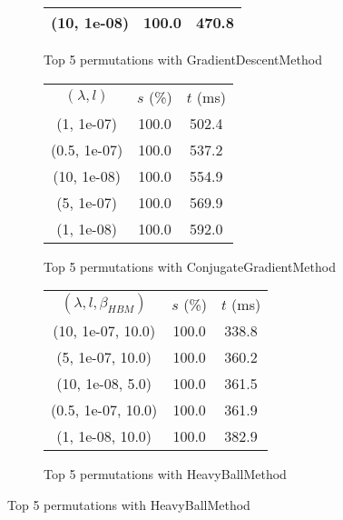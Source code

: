 \begin{figure}[H]
\begin{subfigure}[ht]{.5\textwidth}
\begin{tabular}{|c|c|c|}
(10, 1e-08) & 100.0 & 470.8 \\
\hline
\end{tabular}
\caption{Top 5 permutations with GradientDescentMethod}
\label{subfig:param_comp_MatrixSquareSum_GradientDescentMethod_NewtonsSearch}
\end{subfigure}
\hfill
\begin{subfigure}[ht]{.5\textwidth}
\begin{tabular}{|c|c|c|}
\hline
\rowcolor{gray!25}
\multicolumn{3}{|c|}{ConjugateGradientMethod} \\
\hline
\rowcolor{gray!25}
$(\lambda,l)$ & $s$ (\%) & $t$ (ms) \\
\hline
(1, 1e-07) & 100.0 & 502.4 \\
(0.5, 1e-07) & 100.0 & 537.2 \\
(10, 1e-08) & 100.0 & 554.9 \\
(5, 1e-07) & 100.0 & 569.9 \\
(1, 1e-08) & 100.0 & 592.0 \\
\hline
\end{tabular}
\caption{Top 5 permutations with ConjugateGradientMethod}
\label{subfig:param_comp_MatrixSquareSum_ConjugateGradientMethod_NewtonsSearch}
\end{subfigure}
\hfill
\begin{subfigure}[ht]{.5\textwidth}
\begin{tabular}{|c|c|c|}
\hline
\rowcolor{gray!25}
\multicolumn{3}{|c|}{HeavyBallMethod} \\
\hline
\rowcolor{gray!25}
$(\lambda,l,\beta_{HBM})$ & $s$ (\%) & $t$ (ms) \\
\hline
(10, 1e-07, 10.0) & 100.0 & 338.8 \\
(5, 1e-07, 10.0) & 100.0 & 360.2 \\
(10, 1e-08, 5.0) & 100.0 & 361.5 \\
(0.5, 1e-07, 10.0) & 100.0 & 361.9 \\
(1, 1e-08, 10.0) & 100.0 & 382.9 \\
\hline
\end{tabular}
\caption{Top 5 permutations with HeavyBallMethod}
\label{subfig:param_comp_MatrixSquareSum_HeavyBallMethod_NewtonsSearch}
\end{subfigure}
\end{figure}

